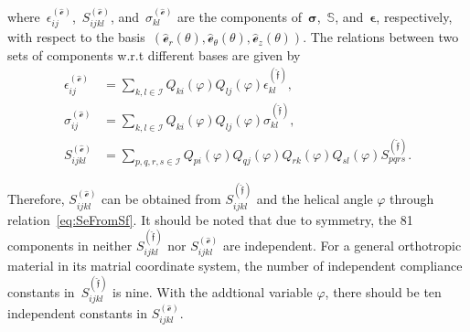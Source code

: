 \documentclass[preprint,12pt,times]{elsarticle}
\numberwithin{equation}{section}
\newcommand{\physe}{\hat{\mathscr{e}}} %
\newcommand{\physf}{\hat{\boldsymbol{\mathfrak{f}}}}
\renewcommand{\u}[1]{\boldsymbol{#1}}
\newcommand{\pr}[1]{\left( #1 \right)}
\renewcommand{\>}{$\Rightarrow$}
\begin{document}
where~$\epsilon_{ij}^{\pr{\physe}}$,~$S_{ijkl}^{\pr{\physe}}$, and~$\sigma_{kl}^{\pr{\physe}}$ are the components of~$\u{\sigma}$,~$\mathbb{S}$, and~$\u{\epsilon}$, respectively, with respect to the basis~$(\physe_{r}(\theta),\physe_{\theta}(\theta),\physe_{z}(\theta))$. The relations between two sets of components w.r.t different bases are given by
\begin{align}
\epsilon_{ij}^{\pr{\physe}} & = \sum_{k,l \in \mathcal{I}} Q_{ki} (\varphi) Q_{lj} (\varphi) \epsilon_{kl}^{\pr{\physf}} , \\
\sigma_{ij}^{\pr{\physe}} & = \sum_{k,l \in \mathcal{I}} Q_{ki}(\varphi) Q_{lj}(\varphi) \sigma_{kl}^{\pr{\physf}} , \\
S_{ijkl}^{\pr{\physe}} & = \sum_{p,q,r,s \in \mathcal{I}} Q_{pi}(\varphi) Q_{qj}(\varphi) Q_{rk}(\varphi) Q_{sl}(\varphi) S_{pqrs}^{\pr{\physf}}. \label{eq:SeFromSf}
\end{align}

Therefore, $S_{ijkl}^{\pr{\physe}}$ can be obtained from $S_{ijkl}^{\pr{\physf}}$ and the helical angle $\varphi$ through relation~\eqref{eq:SeFromSf}.
It should be noted that due to symmetry, the 81 components in neither $S_{ijkl}^{\pr{\physf}}$ nor $S_{ijkl}^{\pr{\physe}}$ are independent.
For a general orthotropic material in its matrial coordinate system, the number of independent compliance constants in~$S_{ijkl}^{\pr{\physf}}$ is nine.
With the addtional variable $\varphi$, there should be ten independent constants in $S_{ijkl}^{\pr{\physe}}$.
\end{document}
